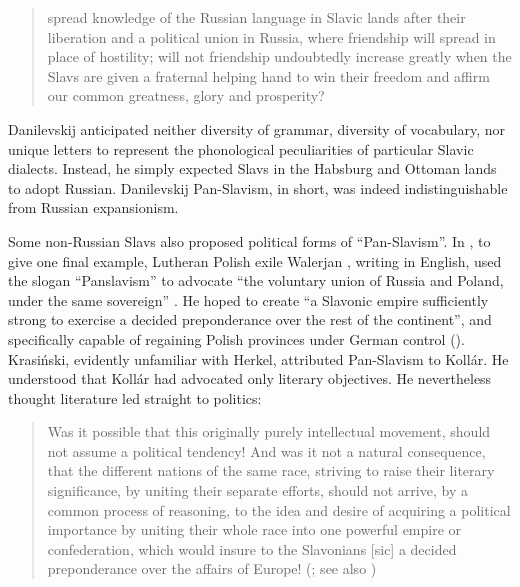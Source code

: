 \begin{quote}
    spread knowledge of the Russian language in Slavic lands after their liberation and a political union in Russia, where friendship will spread in place of hostility; will not friendship undoubtedly increase greatly when the Slavs are given a fraternal helping hand to win their freedom and affirm our common greatness, glory and prosperity? \citep[458]{danilievskij_rossija_1871}
\end{quote}

\noindent {}Danilevskij anticipated neither diversity of grammar, diversity of vocabulary, nor unique letters to represent the phonological peculiarities of particular Slavic dialects. Instead, he simply expected Slavs in the Habsburg and Ottoman lands to adopt Russian. Danilevskij Pan-Slavism, in short, was indeed indistinguishable from Russian expansionism.

Some non-Russian Slavs also proposed political forms of “Pan-Slavism”. In \citeyear{krasinski_panslavism_1848}, to give one final example, Lutheran Polish exile Walerjan \citeauthor{krasinski_panslavism_1848}, writing in English, used the slogan “Panslavism” to advocate “the voluntary union of Russia and Poland, under the same sovereign” \citep[88--89]{krasinski_panslavism_1848}. He hoped to create “a Slavonic empire sufficiently strong to exercise a decided preponderance over the rest of the continent”, and specifically capable of regaining Polish provinces under German control (\citeyear[88--89]{krasinski_panslavism_1848}). Krasiński, evidently unfamiliar with Herkel, attributed Pan-Slavism to Kollár. He understood that Kollár had advocated only literary objectives. He nevertheless thought literature led straight to politics:

\begin{quote}
    Was it possible that this originally purely intellectual movement, should not assume a political tendency! And was it not a natural consequence, that the different nations of the same race, striving to raise their literary significance, by uniting their separate efforts, should not arrive, by a common process of reasoning, to the idea and desire of acquiring a political importance by uniting their whole race into one powerful empire or confederation, which would insure to the Slavonians [sic] a decided preponderance over the affairs of Europe! (\cite[111--112]{krasinski_panslavism_1848}; see also \cite[101--120]{maxwell_walerjan_2008})
\end{quote}

